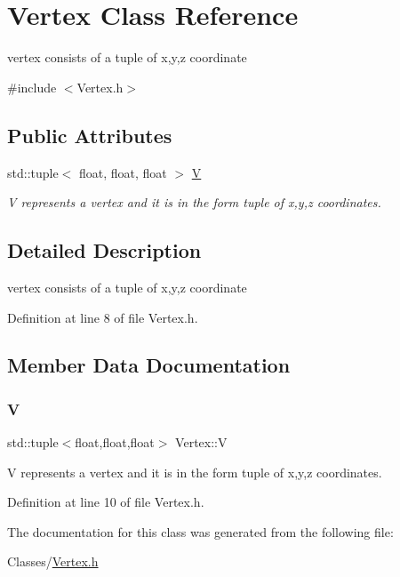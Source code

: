 \hypertarget{class_vertex}{}\section{Vertex Class Reference}
\label{class_vertex}


vertex consists of a tuple of x,y,z coordinate  




{\ttfamily \#include $<$Vertex.\+h$>$}

\subsection*{Public Attributes}
\begin{DoxyCompactItemize}
\item 
std\+::tuple$<$ float, float, float $>$ \mbox{\hyperlink{class_vertex_ae53abaa6d836fa2261e6cdb8d597931d}{V}}
\begin{DoxyCompactList}\small\item\em V represents a vertex and it is in the form tuple of x,y,z coordinates. \end{DoxyCompactList}\end{DoxyCompactItemize}


\subsection{Detailed Description}
vertex consists of a tuple of x,y,z coordinate 

Definition at line 8 of file Vertex.\+h.



\subsection{Member Data Documentation}
\mbox{\label{class_vertex_ae53abaa6d836fa2261e6cdb8d597931d}} 
\subsubsection{\texorpdfstring{V}{V}}
{\footnotesize\ttfamily std\+::tuple$<$float,float,float$>$ Vertex\+::V}



V represents a vertex and it is in the form tuple of x,y,z coordinates. 



Definition at line 10 of file Vertex.\+h.



The documentation for this class was generated from the following file\+:\begin{DoxyCompactItemize}
\item 
Classes/\mbox{\hyperlink{_vertex_8h}{Vertex.\+h}}\end{DoxyCompactItemize}
